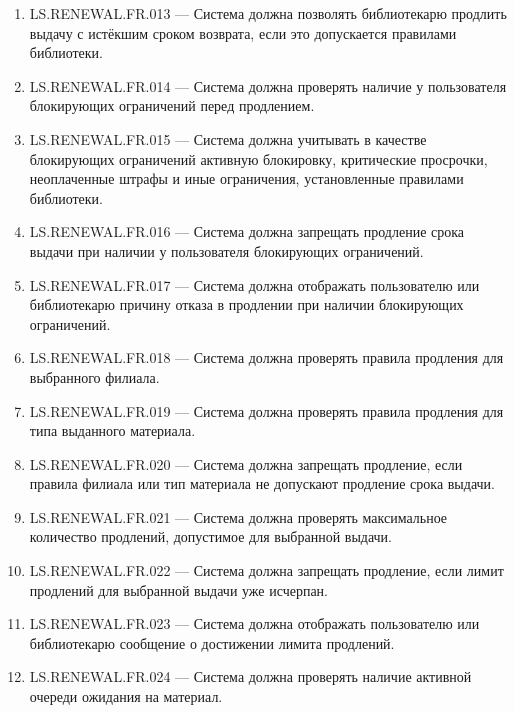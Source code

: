 \documentclass[12pt,a4paper]{article}
\begin{document}
\begin{enumerate}
		\item LS.RENEWAL.FR.013 --- Система должна позволять библиотекарю продлить выдачу
		с истёкшим сроком возврата, если это допускается правилами библиотеки.
		
		\item LS.RENEWAL.FR.014 --- Система должна проверять наличие у пользователя
		блокирующих ограничений перед продлением.
		
		\item LS.RENEWAL.FR.015 --- Система должна учитывать в качестве блокирующих
		ограничений активную блокировку, критические просрочки, неоплаченные штрафы
		и иные ограничения, установленные правилами библиотеки.
		
		\item LS.RENEWAL.FR.016 --- Система должна запрещать продление срока выдачи при
		наличии у пользователя блокирующих ограничений.
		
		\item LS.RENEWAL.FR.017 --- Система должна отображать пользователю или библиотекарю
		причину отказа в продлении при наличии блокирующих ограничений.
		
		\item LS.RENEWAL.FR.018 --- Система должна проверять правила продления для выбранного
		филиала.
		
		\item LS.RENEWAL.FR.019 --- Система должна проверять правила продления для типа
		выданного материала.
		
		\item LS.RENEWAL.FR.020 --- Система должна запрещать продление, если правила филиала
		или тип материала не допускают продление срока выдачи.
		
		\item LS.RENEWAL.FR.021 --- Система должна проверять максимальное количество
		продлений, допустимое для выбранной выдачи.
		
		\item LS.RENEWAL.FR.022 --- Система должна запрещать продление, если лимит продлений
		для выбранной выдачи уже исчерпан.
		
		\item LS.RENEWAL.FR.023 --- Система должна отображать пользователю или библиотекарю
		сообщение о достижении лимита продлений.
		
		\item LS.RENEWAL.FR.024 --- Система должна проверять наличие активной очереди
		ожидания на материал.
		

\end{enumerate}
\end{document}
